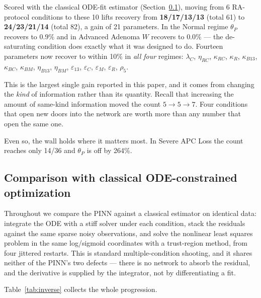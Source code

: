 \documentclass[11pt]{article}
\newcommand{\thP}{\theta_P}
\begin{document}
Scored with the classical ODE-fit estimator (Section~\ref{sec:odefit}), moving
from 6 RA-protocol conditions to these 10 lifts recovery from
\textbf{18/17/13/13} (total 61) to \textbf{24/23/21/14} (total 82), a gain of
21 parameters. In the Normal regime $\thP$ recovers to $0.9\%$ and in Advanced
Adenoma $W$ recovers to $0.0\%$ --- the de-saturating condition does exactly
what it was designed to do. Fourteen parameters now recover to within 10\% in
\emph{all four} regimes: $\lambda_C$, $\eta_{RC}$, $\kappa_{RC}$, $\kappa_R$,
$\kappa_{B13}$, $\kappa_{BC}$, $\kappa_{BM}$, $\eta_{B13}$, $\eta_{BM}$,
$\varepsilon_{13}$, $\varepsilon_C$, $\varepsilon_M$, $\varepsilon_R$,
$\rho_5$.

This is the largest single gain reported in this paper, and it comes from
changing the \emph{kind} of information rather than its quantity. Recall that
increasing the amount of same-kind information moved the count $5 \to 5 \to 7$.
Four conditions that open new doors into the network are worth more than any
number that open the same one.

Even so, the wall holds where it matters most. In Severe APC Loss the count
reaches only 14/36 and $\thP$ is off by 264\%.

\subsection{Comparison with classical ODE-constrained optimization}
\label{sec:odefit}

Throughout we compare the PINN against a classical estimator on identical data:
integrate the ODE with a stiff solver under each condition, stack the residuals
against the same sparse noisy observations, and solve the nonlinear least
squares problem in the same log/sigmoid coordinates with a trust-region
method, from four jittered restarts. This is standard multiple-condition
shooting, and it shares neither of the PINN's two defects --- there is no
network to absorb the residual, and the derivative is supplied by the
integrator, not by differentiating a fit.

Table~\ref{tab:inverse} collects the whole progression.
\end{document}
